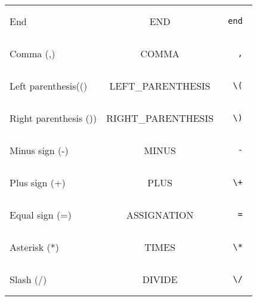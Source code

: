\documentclass[a4paper,10pt]{article}
\begin{document}
\begin{tabular}{|l|c|r|}
End & END & \begin{minipage}{2in} \begin{verbatim} end \end{verbatim} \end{minipage} \\
Comma (,) & COMMA & \begin{minipage}{2in} \begin{verbatim} , \end{verbatim} \end{minipage} \\
Left parenthesis(() & LEFT\_PARENTHESIS & \begin{minipage}{2in} \begin{verbatim} \( \end{verbatim} \end{minipage} \\
Right parenthesis ()) & RIGHT\_PARENTHESIS & \begin{minipage}{2in} \begin{verbatim} \) \end{verbatim} \end{minipage} \\
Minus sign (-) & MINUS & \begin{minipage}{2in} \begin{verbatim} - \end{verbatim} \end{minipage} \\
Plus sign (+) & PLUS & \begin{minipage}{2in} \begin{verbatim} \+ \end{verbatim} \end{minipage} \\
Equal sign (=) & ASSIGNATION & \begin{minipage}{2in} \begin{verbatim} = \end{verbatim} \end{minipage} \\
Asterisk (*) & TIMES & \begin{minipage}{2in} \begin{verbatim} \* \end{verbatim} \end{minipage} \\
Slash (/) & DIVIDE & \begin{minipage}{2in} \begin{verbatim} \/ \end{verbatim} \end{minipage} \\

\end{tabular}
\end{document}
